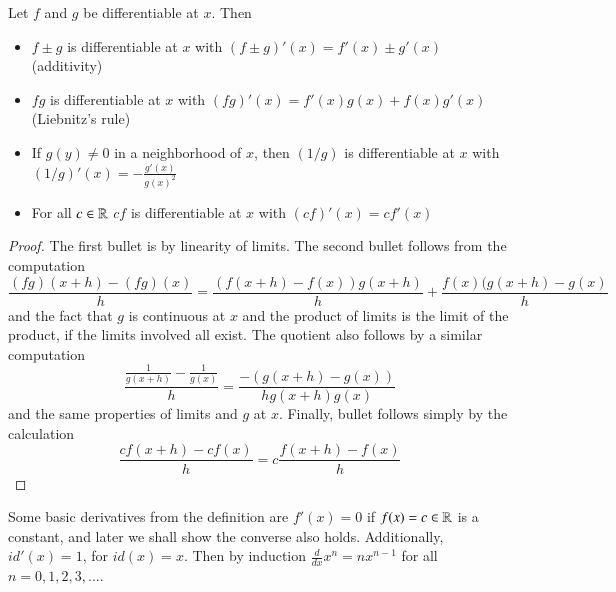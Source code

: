 \begin{subappendices}
    \begin{prop}
        Let $f$ and $g$ be differentiable at $x$. Then \begin{itemize}
            \item $f\pm g$ is differentiable at $x$ with $(f\pm g)'(x) = f'(x)\pm g'(x)$ (additivity) 
            \item $fg$ is differentiable at $x$ with $(fg)'(x) = f'(x)g(x)+f(x)g'(x)$ (Liebnitz's rule) 
            \item If $g(y) \neq 0$ in a neighborhood of $x$, then $(1/g)$ is differentiable at $x$ with $(1/g)'(x) = -\frac{g'(x)}{g(x)^2}$
            \item For all $c \in \mathbb R$ $cf$ is differentiable at $x$ with $(cf)'(x) = cf'(x)$
        \end{itemize}
    \end{prop}
    \begin{proof}
        The first bullet is by linearity of limits. The second bullet follows from the computation \begin{equation*}
            \frac{(fg)(x+h) - (fg)(x)}{h} = \frac{(f(x+h)-f(x))g(x+h)}{h} + \frac{f(x)(g(x+h)-g(x)}{h}
        \end{equation*}
        and the fact that $g$ is continuous at $x$ and the product of limits is the limit of the product, if the limits involved all exist. The quotient also follows by a similar computation \begin{equation*}
            \frac{\frac{1}{g(x+h)} - \frac{1}{g(x)}}{h} = \frac{-(g(x+h)-g(x))}{hg(x+h)g(x)}
        \end{equation*}
        and the same properties of limits and $g$ at $x$. Finally, bullet follows simply by the calculation \begin{equation*}
            \frac{cf(x+h) - cf(x)}{h} = c\frac{f(x+h)-f(x)}{h}
        \end{equation*}
    \end{proof}

    Some basic derivatives from the definition are $f'(x) = 0$ if $f(x) = c\in\mathbb R$ is a constant, and later we shall show the converse also holds. Additionally, $id'(x) = 1$, for $id(x) = x$. Then by induction $\frac{d}{dx}x^n = nx^{n-1}$ for all $n = 0,1,2,3,...$.


\end{subappendices}
